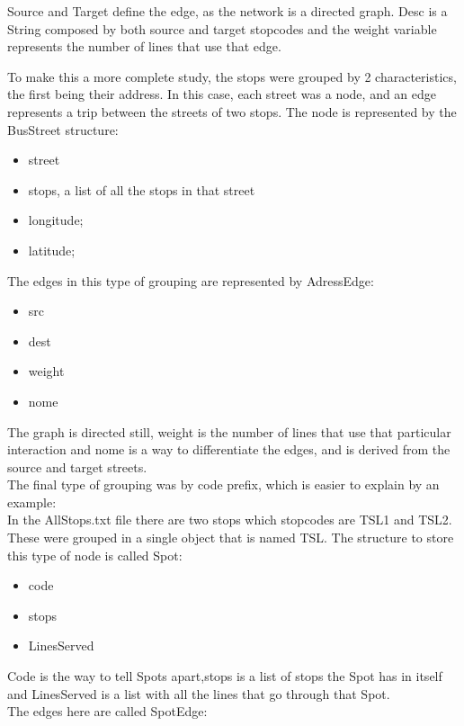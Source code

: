 \documentclass[12pt]{article}
\begin{document}
\begin{multicols}{2}
Source and Target define the edge, as the network is a directed graph. Desc is a String composed by both source and target stopcodes and the weight variable represents the number of lines that use that edge. 

To make this a more complete study, the stops were grouped by 2 characteristics, the first being their address. In this case, each street was a node, and an edge represents a trip between the streets of two stops. The node is represented by the BusStreet structure:

\begin{itemize}
	\item street
	\item stops, a list of all the stops in that street
	\item longitude;
	\item latitude;
\end{itemize}

The edges in this type of grouping are represented by AdressEdge:
	
\begin{itemize}
	\item src
	\item dest
	\item weight
	\item nome
\end{itemize}
	
The graph is directed still, weight is the number of lines that use that particular interaction and nome is a way to differentiate the edges, and is derived from the source and target streets.\\

The final type of grouping was by code prefix, which is easier to explain by an example:\\
In the AllStops.txt file there are two stops which stopcodes are TSL1 and TSL2. These were grouped in a single object that is named TSL. The structure to store this type of node is called Spot:

\begin{itemize}
	\item code
	\item stops
	\item LinesServed
\end{itemize}
	
Code is the way to tell Spots apart,stops is a list of stops the Spot has in itself and LinesServed is a list with all the lines that go through that Spot.\\ 
The edges here are called SpotEdge:\\


\end{multicols}
\end{document}

